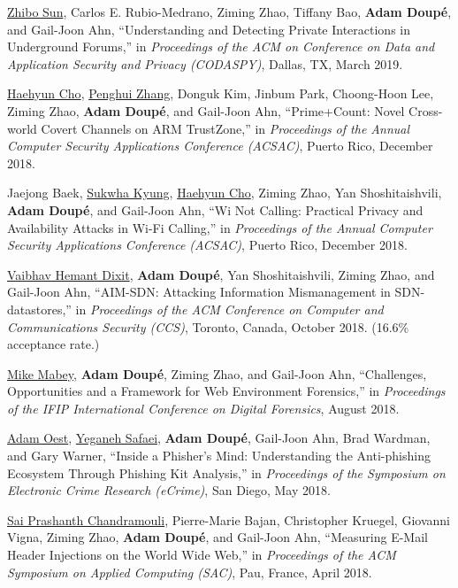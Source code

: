 \documentclass[11pt,letterpaper,sans]{moderncv}
\begin{document}
\begin{etaremune}
\item \underline{Zhibo Sun}, Carlos E.
Rubio-Medrano, Ziming Zhao, Tiffany Bao, \textbf{Adam Doup\'e}, and Gail-Joon Ahn, ``Understanding and Detecting Private Interactions in Underground Forums,'' in \emph{Proceedings of the ACM on Conference on Data and Application Security and Privacy (CODASPY)}, Dallas, TX, March 2019.

\item \underline{Haehyun Cho}, \underline{Penghui Zhang}, Donguk Kim, Jinbum Park, Choong-Hoon Lee, Ziming Zhao, \textbf{Adam Doup\'e}, and Gail-Joon Ahn, ``Prime+Count: Novel Cross-world Covert Channels on ARM TrustZone,'' in \emph{Proceedings of the Annual Computer Security Applications Conference (ACSAC)}, Puerto Rico, December 2018.

\item Jaejong Baek, \underline{Sukwha Kyung}, \underline{Haehyun Cho}, Ziming Zhao, Yan Shoshitaishvili, \textbf{Adam Doup\'e}, and Gail-Joon Ahn, ``Wi Not Calling: Practical Privacy and Availability Attacks in Wi-Fi Calling,'' in \emph{Proceedings of the Annual Computer Security Applications Conference (ACSAC)}, Puerto Rico, December 2018.

\item \underline{Vaibhav Hemant Dixit}, \textbf{Adam Doup\'e}, Yan
  Shoshitaishvili, Ziming Zhao, and Gail-Joon Ahn, ``AIM-SDN:
  Attacking Information Mismanagement in SDN-datastores,'' in
  \emph{Proceedings of the ACM Conference on Computer and
    Communications Security (CCS)}, Toronto, Canada, October 2018. (16.6\% acceptance rate.)

\item \underline{Mike Mabey}, \textbf{Adam Doup\'e}, Ziming Zhao, and Gail-Joon Ahn, ``Challenges, Opportunities and a Framework for Web Environment Forensics,'' in \emph{Proceedings of the IFIP International Conference on Digital Forensics}, August 2018.
  

\item \underline{Adam Oest}, \underline{Yeganeh Safaei}, \textbf{Adam Doup\'e},
  Gail-Joon Ahn, Brad Wardman, and Gary Warner, ``Inside a Phisher's
  Mind: Understanding the Anti-phishing Ecosystem Through Phishing Kit
  Analysis,'' in \emph{Proceedings of the Symposium on Electronic
    Crime Research (eCrime)}, San Diego, May 2018. 
  
\item \underline{Sai Prashanth Chandramouli}, Pierre-Marie Bajan,
  Christopher Kruegel, Giovanni Vigna, Ziming Zhao, \textbf{Adam Doup\'e}, and
  Gail-Joon Ahn, ``Measuring E-Mail Header Injections on the World
  Wide Web,'' in \emph{Proceedings of the ACM Symposium on Applied
    Computing (SAC)}, Pau, France, April 2018.


\end{etaremune}
\end{document}
